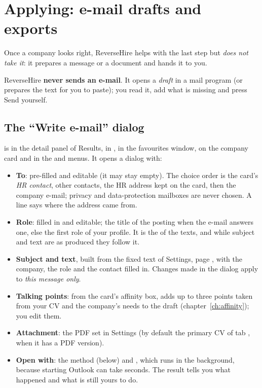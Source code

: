\chapter{Applying: e-mail drafts and exports}\label{ch:apply}

Once a company looks right, ReverseHire helps with the last step but \emph{does not take
it}: it prepares a message or a document and hands it to you.

\begin{warnbox}
ReverseHire \textbf{never sends an e-mail}. It opens a \emph{draft} in a mail program (or
prepares the text for you to paste); you read it, add what is missing and press Send
yourself.
\end{warnbox}

\section{The ``Write e-mail'' dialog}
 is in the detail panel of Results, in , in the
favourites window, on the company card and in the  and 
menus. It opens a dialog with:
\begin{itemize}
  \item \textbf{To}: pre-filled and editable (it may stay empty). The choice order is the
        card's \emph{HR contact}, other contacts, the HR address kept on the card, then the
        company e-mail; privacy and data-protection mailboxes are never chosen. A line
        says where the address came from.
  \item \textbf{Role}: filled in and editable; the title of the posting when the e-mail answers one, else the first role of your profile. It is the  of the texts, and while subject and text are as produced they follow it.
  \item \textbf{Subject and text}, built from the fixed text of Settings, page ,
        with the company, the role and the contact filled in. Changes made in the
        dialog apply to \emph{this message only}.
  \item \textbf{Talking points}: from the card's affinity box,  adds up to three points
        taken from your CV and the company's needs to the draft (chapter~\ref{ch:affinity}); you edit them.
  \item \textbf{Attachment}: the PDF set in Settings (by default the primary CV of tab
        , when it has a PDF version).
  \item \textbf{Open with}: the method (below) and , which runs in the
        background, because starting Outlook can take seconds. The result tells you what
        happened and what is still yours to do.
\end{itemize}

